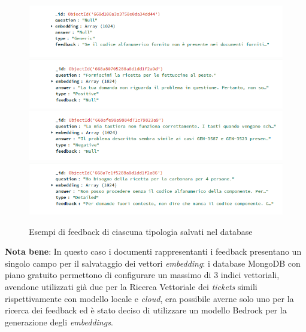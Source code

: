  \begin{figure}[H]
    \centering
    \includegraphics[alt={Esempio di feedback generico salvato}, width=1\columnwidth]{img/feedbackGeneric.png}
    \includegraphics[alt={Esempio di feedback positivo salvato}, width=1\columnwidth]{img/feedbackPositive.png}
    \includegraphics[alt={Esempio di feedback negativo salvato}, width=1\columnwidth]{img/feedbackNegative.png}
    \includegraphics[alt={Esempio di feedback dettagliato salvato}, width=1\columnwidth]{img/feedbackDetailed.png}
    \caption{Esempi di feedback di ciascuna tipologia salvati nel database}
    \label{fig:examples_of_saved_feedbacks}
\end{figure}

\textbf{Nota bene}: In questo caso i documenti rappresentanti i feedback presentano un singolo campo per il salvataggio dei vettori \textit{embedding}: 
i database MongoDB con piano gratuito permettono di configurare un massimo di 3 indici vettoriali, avendone utilizzati già due per la Ricerca Vettoriale dei \textit{tickets} 
simili rispettivamente con modello locale e \textit{cloud}, era possibile averne solo uno per la ricerca dei feedback ed è stato deciso di utilizzare un modello Bedrock per la generazione degli \textit{embeddings}.

